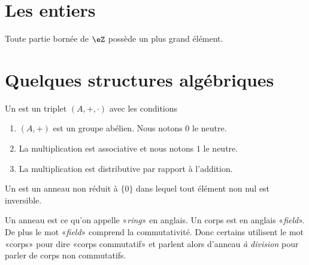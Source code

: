 \section{Les entiers}


\begin{lemma}       \label{LEMooMYEIooNFwNVI}
    Toute partie bornée de \( \eZ\) possède un plus grand élément.
\end{lemma}

\section{Quelques structures algébriques}

\begin{definition}     \label{DefHXJUooKoovob}
    Un  est un triplet \( (A,+,\cdot)\) avec les conditions
    \begin{enumerate}
        \item
            \( (A,+)\) est un groupe abélien. Nous notons \( 0\) le neutre.
        \item
            La multiplication est associative et nous notons \( 1\) le neutre.
        \item
            La multiplication est distributive par rapport à l'addition.
    \end{enumerate}
\end{definition}

\begin{definition}  \label{DefTMNooKXHUd}
    Un  est un anneau non réduit à \( \{ 0 \}\) dans lequel tout élément non nul est inversible.
\end{definition}

\begin{remark}      \label{REMooYRNUooYgBBKF}
    Un anneau est ce qu'on appelle «\emph{ring}» en anglais. Un corps est en anglais «\emph{field}». De plus le mot «\emph{field}» comprend la commutativité. Donc certains utilisent le mot «corps» pour dire «corps commutatif» et parlent alors d'anneau \emph{à division} pour parler de corps non commutatifs.
\end{remark}

